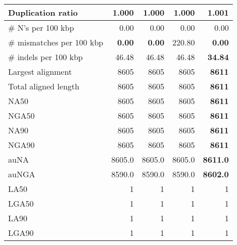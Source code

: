 \documentclass[12pt,a4paper]{article}
\begin{document}
\begin{table}[ht]
\begin{center}
\begin{tabular}{|l*{4}{|r}|}
Duplication ratio & {\bf 1.000} & {\bf 1.000} & {\bf 1.000} & 1.001 \\ \hline
\# N's per 100 kbp & 0.00 & 0.00 & 0.00 & 0.00 \\ \hline
\# mismatches per 100 kbp & {\bf 0.00} & {\bf 0.00} & 220.80 & {\bf 0.00} \\ \hline
\# indels per 100 kbp & 46.48 & 46.48 & 46.48 & {\bf 34.84} \\ \hline
Largest alignment & 8605 & 8605 & 8605 & {\bf 8611} \\ \hline
Total aligned length & 8605 & 8605 & 8605 & {\bf 8611} \\ \hline
NA50 & 8605 & 8605 & 8605 & {\bf 8611} \\ \hline
NGA50 & 8605 & 8605 & 8605 & {\bf 8611} \\ \hline
NA90 & 8605 & 8605 & 8605 & {\bf 8611} \\ \hline
NGA90 & 8605 & 8605 & 8605 & {\bf 8611} \\ \hline
auNA & 8605.0 & 8605.0 & 8605.0 & {\bf 8611.0} \\ \hline
auNGA & 8590.0 & 8590.0 & 8590.0 & {\bf 8602.0} \\ \hline
LA50 & 1 & 1 & 1 & 1 \\ \hline
LGA50 & 1 & 1 & 1 & 1 \\ \hline
LA90 & 1 & 1 & 1 & 1 \\ \hline
LGA90 & 1 & 1 & 1 & 1 \\ \hline
\end{tabular}
\end{center}
\end{table}
\end{document}
